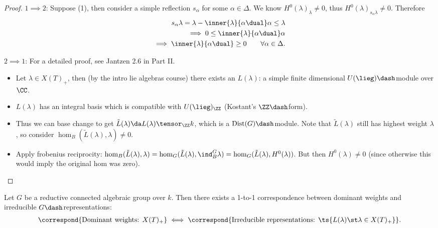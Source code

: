 \begin{proof}

\(1\implies 2\): Suppose (1), then consider a simple reflection
\(s_\alpha\) for some \(\alpha \in \Delta\). We know
\(H^0(\lambda)_\lambda \neq 0\), thus
\(H^0(\lambda)_{s_\alpha \lambda} \neq 0\). Therefore
\begin{align*}  
s_\alpha \lambda = \lambda - \inner{\lambda}{\alpha\dual}\alpha \leq \lambda \\
\implies 0 \leq \inner{\lambda}{\alpha\dual}\alpha \\
\implies \inner{\lambda}{\alpha\dual} \geq 0 \qquad \forall \alpha\in \Delta
.\end{align*}

\(2\implies 1\): For a detailed proof, see Jantzen 2.6 in Part II.

\begin{itemize}
\item
  Let \(\lambda \in X(T)_+\), then (by the intro lie algebras course)
  there exists an \(L(\lambda)\): a simple finite dimensional
  \(U(\lieg)\dash\)module over \(\CC\).
\item
  \(L(\lambda)\) has an integral basis which is compatible with
  \(U(\lieg)_\ZZ\) (Kostant's \(\ZZ\dash\)form).
\item
  Thus we can base change to get
  \(\tilde L(\lambda) \da L(\lambda) \tensor_\ZZ k\), which is a
  \(\mathrm{Dist}(G)\dash\)module. Note that \(\tilde L(\lambda)\) still
  has highest weight \(\lambda\), so consider
  \(\hom_B(\tilde L(\lambda), \lambda) \neq 0\).
\item
  Apply frobenius reciprocity:
  \(\hom_B(\tilde L(\lambda), \lambda) = \hom_G(\tilde L(\lambda), \ind_B^G \lambda) = \hom_G(\tilde L(\lambda), H^0(\lambda))\).
  But then \(H^0(\lambda) \neq 0\) (since otherwise this would imply the
  original hom was zero).
\end{itemize}

\end{proof}

\begin{theorem}[?]

Let \(G\) be a reductive connected algebraic group over \(k\). Then
there exists a 1-to-1 correspondence between dominant weights and
irreducible \(G\dash\)representations:
\begin{align*}  
\correspond{\text{Dominant weights: } X(T)_+} \iff
\correspond{\text{Irreducible representations: }\ts{L(\lambda) \st \lambda \in X(T)_+} }
.\end{align*}

\end{theorem}

